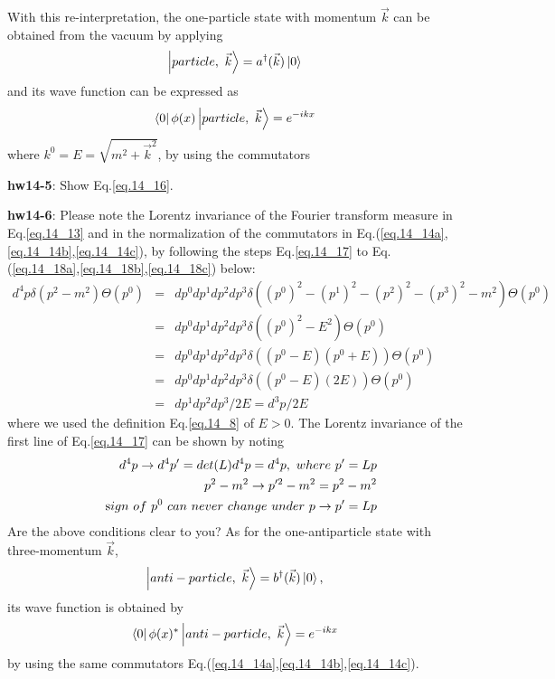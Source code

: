 \documentclass[12pt]{article}
\begin{document}
  With this re-interpretation, the one-particle state with momentum
  ${\vec k}$ can be obtained from the vacuum by applying
  \begin{eqnarray}
   \ket{particle,~{\vec k}}= a^\dagger({\vec k}) \ket{0} \label{eq.14_15}
  \end{eqnarray}
  and its wave function can be expressed as
\begin{eqnarray}
  \bra{0} \phi(x) \ket{particle,~{\vec k}}=  e^{-ikx} \label{eq.14_16}
\end{eqnarray}
  where $k^0 = E = \sqrt{ m^2 + {\vec k}^2 }$, by using the commutators

{\bf hw14-5}: Show Eq.\ref{eq.14_16}.

{\bf hw14-6}: Please note the Lorentz invariance of the Fourier transform
  measure in Eq.\ref{eq.14_13} and in the normalization of the commutators in Eq.(\ref{eq.14_14a},\ref{eq.14_14b},\ref{eq.14_14c}),
  by following the steps Eq.\ref{eq.14_17} to Eq.(\ref{eq.14_18a},\ref{eq.14_18b},\ref{eq.14_18c}) below:
\begin{eqnarray}
  d^4 p \delta( p^2 - m^2 ) \Theta(p^0)
  &=&dp^0dp^1dp^2dp^3 \delta((p^0)^2-(p^1)^2-(p^2)^2-(p^3)^2-m^2) \Theta(p^0) \nonumber \\
  &=&dp^0dp^1dp^2dp^3 \delta( (p^0)^2 -E^2 ) \Theta(p^0) \nonumber\\
  &=&dp^0dp^1dp^2dp^3 \delta( (p^0-E) (p^0+E) ) \Theta(p^0)\nonumber\\
  &=&dp^0dp^1dp^2dp^3 \delta( (p^0-E) (2E) ) \Theta(p^0) \nonumber\\
  &=&    dp^1dp^2dp^3/2E
  =    d^3 p/2E \label{eq.14_17}
\end{eqnarray}
  where we used the definition Eq.\ref{eq.14_8} of $E >0$. The Lorentz invariance of the first line of Eq.\ref{eq.14_17} can be shown by noting
\begin{eqnarray}
  &&d^4 p \to d^4 p' = det(L) d^4 p = d^4 p,~where~p'=Lp \label{eq.14_18a}\\
  &&p^2 - m^2 \to p'^2 - m^2 = p^2 - m^2 \label{eq.14_18b} \\
  &&{\text sign~ of~ p^0 ~can~ never~ change~ under~} p \to p'=Lp\label{eq.14_18c}
\end{eqnarray}
  Are the above conditions clear to you?
  As for the one-antiparticle state with three-momentum $\vec{k}$,
  \begin{eqnarray}
    \ket{anti-particle,~{\vec k}}=b ^\dagger({\vec k}) \ket{0},\label{eq.14_19}
  \end{eqnarray}
  its wave function is obtained by
\begin{eqnarray}
  \bra{0}  \phi(x)^*  \ket{anti-particle,~{\vec k}}= e^{-ikx} \label{eq.14_20}
\end{eqnarray}
  by using the same commutators Eq.(\ref{eq.14_14a},\ref{eq.14_14b},\ref{eq.14_14c}).
\end{document}
